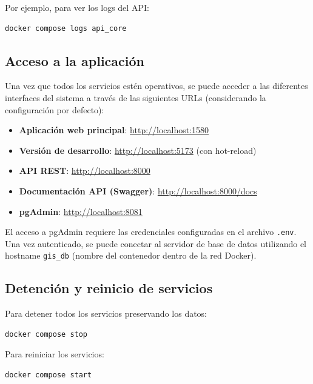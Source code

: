 Por ejemplo, para ver los logs del API:

\begin{lstlisting}[style=bash]
docker compose logs api_core
\end{lstlisting}

\subsection{Acceso a la aplicación}
\label{subsec:chp7-3-3}

Una vez que todos los servicios estén operativos, se puede acceder a las diferentes interfaces del sistema a través de las siguientes URLs (considerando la configuración por defecto):

\begin{itemize}
    \item \textbf{Aplicación web principal}: \url{http://localhost:1580}
    \item \textbf{Versión de desarrollo}: \url{http://localhost:5173} (con hot-reload)
    \item \textbf{API REST}: \url{http://localhost:8000}
    \item \textbf{Documentación API (Swagger)}: \url{http://localhost:8000/docs}
    \item \textbf{pgAdmin}: \url{http://localhost:8081}
\end{itemize}

El acceso a pgAdmin requiere las credenciales configuradas en el archivo \lstinline[style=bash]|.env|. Una vez autenticado, se puede conectar al servidor de base de datos utilizando el hostname \lstinline[style=bash]|gis_db| (nombre del contenedor dentro de la red Docker).

\subsection{Detención y reinicio de servicios}
\label{subsec:chp7-3-4}

Para detener todos los servicios preservando los datos:

\begin{lstlisting}[style=bash]
docker compose stop
\end{lstlisting}

Para reiniciar los servicios:

\begin{lstlisting}[style=bash]
docker compose start
\end{lstlisting}

